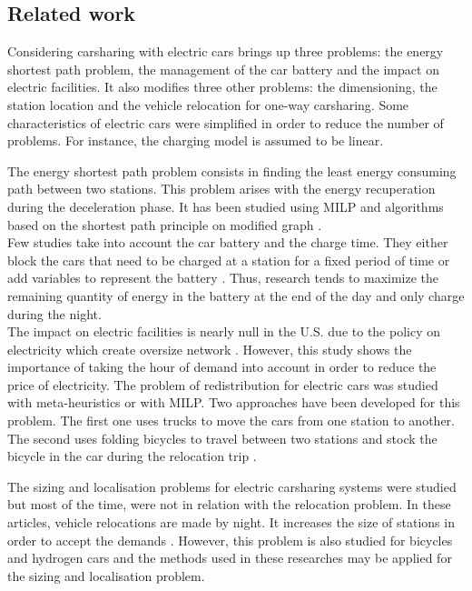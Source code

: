 \begin{bibunit}[ieeetr]
\subsection{Related work}
Considering carsharing with electric cars brings up three problems: the energy shortest path problem, the management of the car battery and the impact on electric facilities.
It also modifies three other problems: the dimensioning, the station location and the vehicle relocation for one-way carsharing.
Some characteristics of electric cars were simplified in order to reduce the number of problems.
For instance, the charging model is assumed to be linear.

The energy shortest path problem consists in finding the least energy consuming path between two stations.
This problem arises with the energy recuperation during the deceleration phase.
It has been studied using MILP \cite{touati_combinatorial_2012} and algorithms based on the shortest path principle on modified graph \cite{artmeier_optimal_2010}.\\
Few studies take into account the car battery and the charge time.
They either block the cars that need to be charged at a station for a fixed period of time \cite{boyaci_optimization_2015} or add variables to represent the battery \cite{bruglieri_vehicle_2014}.
Thus, research tends to maximize the remaining quantity of energy in the battery at the end of the day and only charge during the night.\\
The impact on electric facilities is nearly null in the U.S. due to the policy on electricity which create oversize network \cite{liu_survey_2011}.
However, this study shows the importance of taking the hour of demand into account in order to reduce the price of electricity. 
The problem of redistribution for electric cars was studied with meta-heuristics or with MILP.
Two approaches have been developed for this problem.
The first one uses trucks to move the cars from one station to another.
The second uses folding bicycles to travel between two stations and stock the bicycle in the car during the relocation trip \cite{bruglieri_vehicle_2014}.

The sizing and localisation problems for electric carsharing systems were studied but most of the time, were not in relation with the relocation problem.
In these articles, vehicle relocations are made by night.
It increases the size of stations in order to accept the demands \cite{correia_optimization_2012}.
However, this problem is also studied for bicycles \cite{george_fleet_2011} and hydrogen cars \cite{melaina_initiating_2003} and the methods used in these researches may be applied for the sizing and localisation problem.


\end{bibunit}
